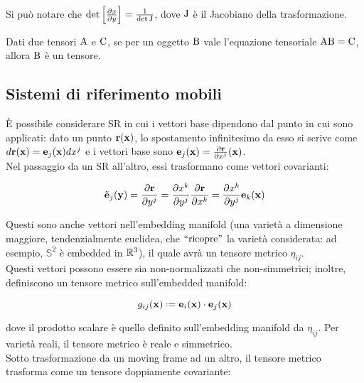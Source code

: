 Si può notare che $ \det\left[\frac{\partial x}{\partial y}\right] = \frac{1}{\det\mathbf{\text{J}}} $, dove $ \mathbf{\text{J}} $ è il Jacobiano della trasformazione.

\begin{theorem}
	Dati due tensori $ \mathbf{\text{A}} $ e $ \mathbf{\text{C}} $, se per un oggetto $ \mathbf{\text{B}} $ vale l'equazione tensoriale $ \mathbf{\text{A}}\mathbf{\text{B}} = \mathbf{\text{C}} $, allora $ \mathbf{\text{B}} $ è un tensore.
\end{theorem}

\subsection{Sistemi di riferimento mobili}

È possibile considerare SR in cui i vettori base dipendono dal punto in cui sono applicati: dato un punto $ \mathbf{r}(\mathbf{x}) $, lo spostamento infinitesimo da esso si scrive come $ d\mathbf{r}(\mathbf{x}) = \mathbf{e}_j(\mathbf{x}) dx^j $ e i vettori base sono $ \mathbf{e}_j (\mathbf{x}) = \frac{\partial \mathbf{r}}{\partial x^j}(\mathbf{x}) $.\\
Nel passaggio da un SR all'altro, essi trasformano come vettori covarianti:

\begin{equation}
	\tilde{\mathbf{e}}_j (\mathbf{y}) = \frac{\partial \mathbf{r}}{\partial y^j} = \frac{\partial x^k}{\partial y^j} \frac{\partial \mathbf{r}}{\partial x^k} = \frac{\partial x^k}{\partial y^j} \mathbf{e}_k (\mathbf{x})
	\label{eq:1.14}
\end{equation}

Questi sono anche vettori nell'embedding manifold (una varietà a dimensione maggiore, tendenzialmente euclidea, che $ ``\text{ricopre}" $ la varietà considerata: ad esempio, $ \mathbb{S}^2 $ è embedded in $ \mathbb{R}^3 $), il quale avrà un tensore metrico $ \eta_{ij} $.\\
Questi vettori possono essere sia non-normalizzati che non-simmetrici; inoltre, definiscono un tensore metrico sull'embedded manifold:

\begin{equation}
	g_{ij} (\ve{x}) \defeq \ve{e}_i (\ve{x}) \cdot \ve{e}_j (\ve{x})
	\label{eq:1.15}
\end{equation}

dove il prodotto scalare è quello definito sull'embedding manifold da $ \eta_{ij} $. Per varietà reali, il tensore metrico è reale e simmetrico.\\
Sotto trasformazione da un moving frame ad un altro, il tensore metrico trasforma come un tensore doppiamente covariante:

